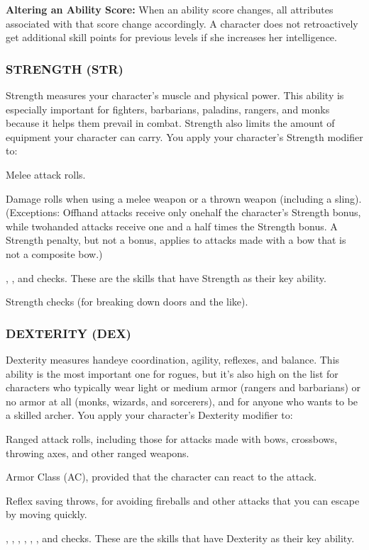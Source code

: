 \textbf{Altering an Ability Score:}
When an ability score changes, all attributes associated with that score change accordingly. A character does not retroactively get additional skill points for previous levels if she increases her intelligence.

\subsubsection{STRENGTH (STR)}

Strength measures your character's muscle and physical power. This ability is especially important for fighters, barbarians, paladins, rangers, and monks because it helps them prevail in combat. Strength also limits the amount of equipment your character can carry.
You apply your character's Strength modifier to:
\begin{itemize*}
	\item Melee attack rolls.
	\item Damage rolls when using a melee weapon or a thrown weapon (including a sling). (Exceptions: Off\textendash hand attacks receive only one\textendash half the character's Strength bonus, while two\textendash handed attacks receive one and a half times the Strength bonus. A Strength penalty, but not a bonus, applies to attacks made with a bow that is not a composite bow.)
	\item {}, , and  checks. These are the skills that have Strength as their key ability.
	\item Strength checks (for breaking down doors and the like).
\end{itemize*}

\subsubsection{DEXTERITY (DEX)}

Dexterity measures hand\textendash eye coordination, agility, reflexes, and balance. This ability is the most important one for rogues, but it's also high on the list for characters who typically wear light or medium armor (rangers and barbarians) or no armor at all (monks, wizards, and sorcerers), and for anyone who wants to be a skilled archer.
You apply your character's Dexterity modifier to:
\begin{itemize*}
	\item Ranged attack rolls, including those for attacks made with bows, crossbows, throwing axes, and other ranged weapons.
	\item Armor Class (AC), provided that the character can react to the attack.
	\item Reflex saving throws, for avoiding fireballs and other attacks that you can escape by moving quickly.
	\item {}, , , , , , and  checks. These are the skills that have Dexterity as their key ability.
\end{itemize*}

